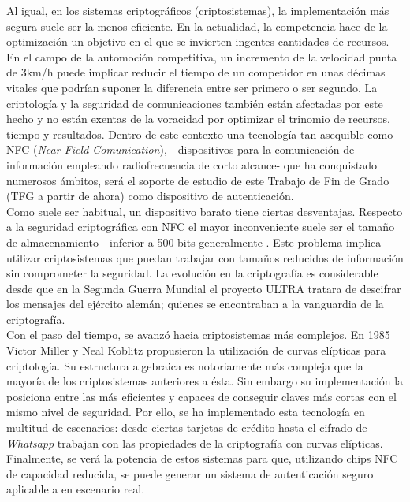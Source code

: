 \documentclass[../PFC.tex]{subfiles}
\begin{document}
Al igual, en los sistemas criptográficos (criptosistemas), la implementación más segura suele ser la menos eficiente. En la actualidad, la competencia  hace de la optimización un objetivo en el que se invierten ingentes cantidades de recursos. En el campo de la automoción competitiva, un incremento de la velocidad punta de 3km/h puede implicar reducir el tiempo de un competidor en unas décimas vitales que podrían suponer la diferencia entre ser primero o ser segundo. La criptología y la seguridad de comunicaciones también están afectadas por este hecho y no están exentas de la voracidad por optimizar el trinomio de recursos, tiempo y resultados. Dentro de este contexto una tecnología tan asequible como NFC (\textit{Near Field Comunication}), - dispositivos para la comunicación de información empleando radiofrecuencia de corto alcance- que ha conquistado numerosos ámbitos, será el soporte de estudio de este Trabajo de Fin de Grado (TFG a partir de ahora) como dispositivo de autenticación.\\

Como suele ser habitual, un dispositivo barato tiene ciertas desventajas. Respecto a la seguridad criptográfica con NFC el mayor inconveniente suele ser el tamaño de almacenamiento - inferior a 500 bits generalmente-. Este problema implica utilizar criptosistemas que puedan trabajar con tamaños reducidos de información sin comprometer la seguridad. La evolución en la criptografía es considerable desde que en la Segunda Guerra Mundial el proyecto ULTRA tratara de descifrar los mensajes del ejército alemán; quienes se encontraban a la vanguardia de la criptografía.\\

Con el paso del tiempo, se avanzó hacia criptosistemas más complejos. En 1985 Victor Miller y Neal Koblitz propusieron la utilización de curvas elípticas para criptología. Su estructura algebraica es notoriamente más compleja que la mayoría de los criptosistemas anteriores a ésta. Sin embargo su implementación la posiciona entre las más eficientes y capaces de conseguir claves más cortas con el mismo nivel de seguridad\cite{lucena}. Por ello, se ha implementado esta tecnología en multitud de escenarios: desde ciertas tarjetas de crédito hasta el cifrado de \textit{Whatsapp}\cite{whatsappEncryption} trabajan con las propiedades de la criptografía con curvas elípticas. \\

Finalmente, se verá la potencia de estos sistemas para que, utilizando chips NFC de capacidad reducida, se puede generar un sistema de autenticación seguro aplicable a en escenario real.
\end{document}
